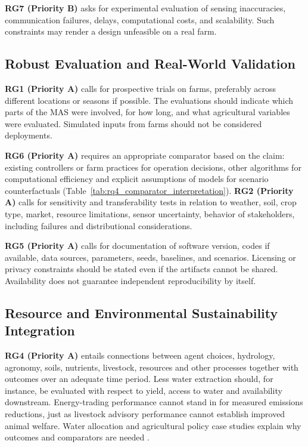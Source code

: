 \documentclass[11pt,a4paper]{article}
\begin{document}
\textbf{RG7 (Priority B)} asks for experimental evaluation of sensing inaccuracies, communication failures, delays, computational costs, and scalability. Such constraints may render a design unfeasible on a real farm.

\subsection{Robust Evaluation and Real-World Validation}

\textbf{RG1 (Priority A)} calls for prospective trials on farms,
preferably across different locations or seasons if possible. The
evaluations should indicate which parts of the MAS were involved, for
how long, and what agricultural variables were evaluated. Simulated inputs from farms should not be considered deployments.

\textbf{RG6 (Priority A)} requires an appropriate comparator based on
the claim: existing controllers or farm practices for operation
decisions, other algorithms for computational efficiency and explicit
assumptions of models for scenario counterfactuals
(Table~\ref{tab:rq4_comparator_interpretation}).
\textbf{RG2 (Priority A)} calls for sensitivity and transferability
tests in relation to weather, soil, crop type, market, resource
limitations, sensor uncertainty, behavior of stakeholders, including
failures and distributional considerations.

\textbf{RG5 (Priority A)} calls for documentation of software
version, codes if available, data sources, parameters, seeds,
baselines, and scenarios. Licensing or privacy constraints should be
stated even if the artifacts cannot be shared. Availability does not
guarantee independent reproducibility by itself.

\subsection{Resource and Environmental Sustainability Integration}

\textbf{RG4 (Priority A)} entails connections between agent choices,
hydrology, agronomy, soils, nutrients, livestock, resources and other
processes together with outcomes over an adequate time period. Less water
extraction should, for instance, be evaluated with respect to yield,
access to water and availability downstream. Energy-trading performance cannot stand in for measured emissions reductions, just as livestock advisory performance cannot establish improved animal welfare. Water allocation
and agricultural policy case studies explain why outcomes and comparators are needed \parencite{mahmoudian_adaptive_2025,grovermann_smart_2017}.
\end{document}
